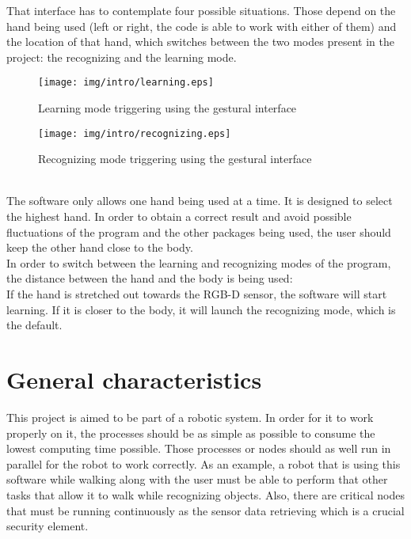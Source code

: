That interface has to contemplate four possible situations. Those depend on the hand being used (left or right, the code is able to work with either of them) and the location of that hand, which switches between the two modes present in the project: the recognizing and the learning mode. 
\\

\begin{wrapfigure}{l}{0.5\textwidth}
	\centering
    \texttt{[image: img/intro/learning.eps]}
	\caption[Learning Mode Triggering]{Learning mode triggering using the gestural interface}
\end{wrapfigure}


\begin{wrapfigure}{r}{0.5\textwidth}
	\centering
    \texttt{[image: img/intro/recognizing.eps]}
	\caption[Recognizing Mode Triggering]{Recognizing mode triggering using the gestural interface}
\end{wrapfigure}
\\

The software only allows one hand being used at a time. It is designed to select the highest hand. In order to obtain a correct result and avoid possible fluctuations of the program and the other packages being used, the user should keep the other hand close to the body. 
\\


In order to switch between the learning and recognizing modes of the program, the distance between the hand and the body
is being used: 
\\

If the hand is stretched out towards the RGB-D sensor, the software will start learning. If it is closer to the body, 
it will launch the recognizing mode, which is the default. 







\section*{General characteristics}
This project is aimed to be part of a robotic system. In order for it to work properly on it, the processes should be as simple as possible to consume the lowest computing time possible. Those processes or nodes should as well run in parallel for the robot to work correctly. As an example, a robot that is using this software while walking along with the user must be able to perform that other tasks that allow it to walk while recognizing objects. Also, there are critical nodes that must be running continuously as the sensor data retrieving which is a crucial security element. 
\\

